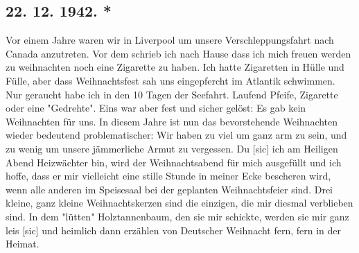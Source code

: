 \subsection{22. 12. 1942. *}

Vor einem Jahre waren wir in Liverpool um unsere Verschleppungsfahrt nach Canada anzutreten.
Vor dem schrieb ich nach Hause dass ich mich freuen werden zu weihnachten noch eine Zigarette zu haben.
Ich hatte Zigaretten in H\"{u}lle und F\"{u}lle, aber dass Weihnachtsfest sah uns eingepfercht im Atlantik schwimmen.
Nur geraucht habe ich in den 10 Tagen der Seefahrt.
Laufend Pfeife, Zigarette oder eine "Gedrehte".
Eins war aber fest und sicher gel\"{o}st: Es gab kein Weihnachten f\"{u}r uns.
In diesem Jahre ist nun das bevorstehende Weihnachten wieder bedeutend problematischer: Wir haben zu viel um ganz arm zu sein, und zu wenig um unsere j\"{a}mmerliche Armut zu vergessen.
Du{\color{red} [sic] } ich am Heiligen Abend Heizw\"{a}chter bin, wird der Weihnachtsabend f\"{u}r mich ausgef\"{u}llt und ich hoffe, dass er mir vielleicht eine stille Stunde in meiner Ecke bescheren wird, wenn alle anderen im Speisesaal bei der geplanten Weihnachtsfeier sind.
Drei kleine, ganz kleine Weihnachtskerzen sind die einzigen, die mir diesmal verblieben sind.
In dem "l\"{u}tten" Holztannenbaum, den sie mir schickte, werden sie mir ganz leis{\color{red} [sic] } und heimlich dann erz\"{a}hlen von Deutscher Weihnacht fern, fern in der Heimat.

\clearpage
